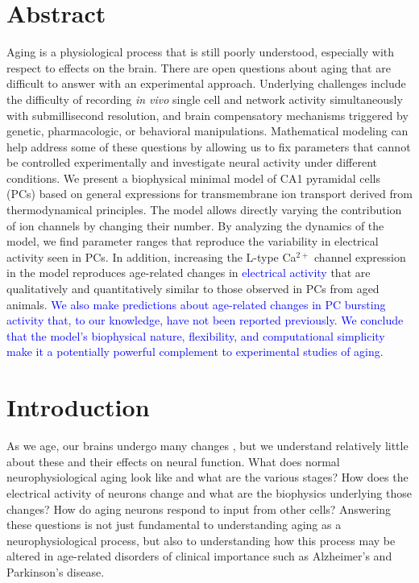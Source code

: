 \documentclass[10pt,letterpaper]{article}
\newcommand{\Ca}{Ca$^{2+}$}
\newcommand{\edit}[1]{\textcolor{blue}{#1}}
\begin{document}
\section*{Abstract}
Aging is a physiological process that is still poorly understood, especially with respect to effects on the brain. There are open questions about aging that are difficult to answer with an experimental approach. Underlying challenges include  the difficulty of recording \textit{in vivo} single cell and network activity simultaneously with submillisecond  resolution, and brain compensatory mechanisms triggered by genetic, pharmacologic, or behavioral manipulations. Mathematical modeling can help address some of these questions by allowing us to fix parameters that cannot be controlled experimentally and investigate neural activity under different conditions. We present a biophysical minimal model of CA1 pyramidal cells (PCs) based on general expressions for transmembrane ion transport derived from thermodynamical principles. The model allows directly varying the contribution of ion channels by changing their number. By analyzing the dynamics of the model, we find parameter ranges that reproduce the variability in electrical activity seen in PCs. In addition, increasing the L-type {\Ca} channel expression in the model reproduces age-related changes in \edit{electrical activity} that are qualitatively and quantitatively similar to those observed in PCs from aged animals. \edit{We also make predictions about age-related changes in PC bursting activity that, to our knowledge, have not been reported previously. We conclude that the model's biophysical nature, flexibility, and computational simplicity make it a potentially powerful complement to experimental studies of aging.}


\linenumbers

\section*{Introduction}
As we age, our brains undergo many changes
\cite{oh2010learning,rosenzweig2003impact}, but we understand relatively little about these and their effects on neural function. What does normal neurophysiological aging look like and what are the various stages? How does the electrical activity of neurons change and what are the biophysics underlying those changes?  How do aging neurons respond to input from other cells? Answering these questions is not just fundamental to understanding aging as a neurophysiological process, but also to understanding how this process may be altered in age-related disorders of clinical importance such as Alzheimer's \cite{fjell2014normal} and Parkinson's \cite{rodriguez2015parkinson} disease.
\end{document}
